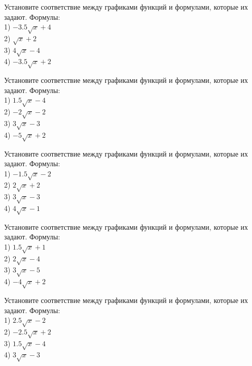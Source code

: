 \documentclass[4apaper]{article}
\begin{document}
\begin{taskBN}{76}
Установите соответствие между графиками функций и формулами, которые их задают. Формулы: \\1) $-3.5\sqrt{x}+4$\\2) $\sqrt{x}+2$\\3) $4\sqrt{x}-4$\\4) $-3.5\sqrt{x}+2$
\end{taskBN}

\begin{taskBN}{77}
Установите соответствие между графиками функций и формулами, которые их задают. Формулы: \\1) $1.5\sqrt{x}-4$\\2) $-2\sqrt{x}-2$\\3) $3\sqrt{x}-3$\\4) $-5\sqrt{x}+2$
\end{taskBN}

\begin{taskBN}{78}
Установите соответствие между графиками функций и формулами, которые их задают. Формулы: \\1) $-1.5\sqrt{x}-2$\\2) $2\sqrt{x}+2$\\3) $3\sqrt{x}-3$\\4) $4\sqrt{x}-1$
\end{taskBN}

\begin{taskBN}{79}
Установите соответствие между графиками функций и формулами, которые их задают. Формулы: \\1) $1.5\sqrt{x}+1$\\2) $2\sqrt{x}-4$\\3) $3\sqrt{x}-5$\\4) $-4\sqrt{x}+2$
\end{taskBN}

\begin{taskBN}{80}
Установите соответствие между графиками функций и формулами, которые их задают. Формулы: \\1) $2.5\sqrt{x}-2$\\2) $-2.5\sqrt{x}+2$\\3) $1.5\sqrt{x}-4$\\4) $3\sqrt{x}-3$
\end{taskBN}
\end{document}
